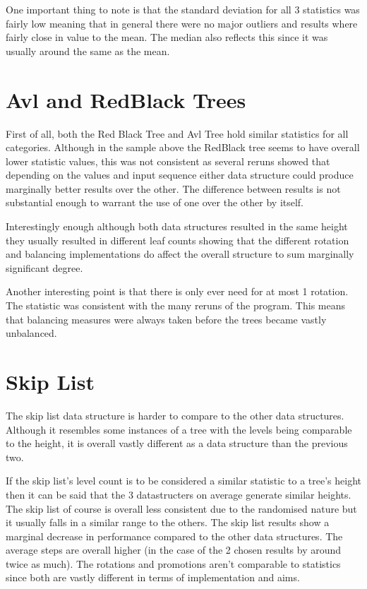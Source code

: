 \documentclass[12pt, a4paper]{report}
\begin{document}
One important thing to note is that the standard deviation for all 3 statistics was fairly low meaning that in general there were no major outliers and results where fairly close in value to the mean. The median also reflects this since it was usually around the same as the mean.

\section{Avl and RedBlack Trees}
First of all, both the Red Black Tree and Avl Tree hold similar statistics for all categories. Although in the sample above the RedBlack tree seems to have overall lower statistic values, this was not consistent as several reruns showed that depending on the values and input sequence either data structure could produce marginally better results over the other. The difference between results is not substantial enough to warrant the use of one over the other by itself.

Interestingly enough although both data structures resulted in the same height they usually resulted in different leaf counts showing that the different rotation and balancing implementations do affect the overall structure to sum marginally significant degree.

Another interesting point is that there is only ever need for at most 1 rotation. The statistic was consistent with the many reruns of the program. This means that balancing measures were always taken before the trees became vastly unbalanced. 

\section{Skip List}
The skip list data structure is harder to compare to the other data structures. Although it resembles some instances of a tree with the levels being comparable to the height, it is overall vastly different as a data structure than the previous two.

If the skip list's level count is to be considered a similar statistic to a tree's height then it can be said that the 3 datastructers on average generate similar heights. The skip list of course is overall less consistent due to the randomised nature but it usually falls in a similar range to the others. The skip list results show a marginal decrease in performance compared to the other data structures. The average steps are overall higher (in the case of the 2 chosen results by around twice as much).  The rotations and promotions aren't comparable to statistics since both are vastly different in terms of implementation and aims.
\end{document}
